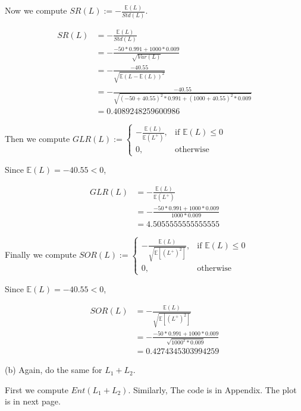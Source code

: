 \documentclass[letterpaper,11pt]{article}
\begin{document}
\begin{spacing}{1.2}
Now we compute $SR(L):= -\frac{\mathbb{E}(L)}{Std(L)}$.

\begin{equation}
\begin{aligned}
SR(L) &= -\frac{\mathbb{E}(L)}{Std(L)} \\
&= -\frac{-50*0.991+1000*0.009}{\sqrt{Var(L)}} \\
&= -\frac{-40.55}{\sqrt{\mathbb{E}(L - \mathbb{E}(L))^2}} \\
&= -\frac{-40.55}{\sqrt{(-50+40.55)^2 * 0.991 + (1000+40.55)^2 * 0.009}} \\
&= 0.4089248259600986
\end{aligned}
\end{equation}

Then we compute $GLR(L):= \begin{cases} -\frac{\mathbb{E}(L)}{\mathbb{E}(L^+)}, & \mbox{if } \mathbb{E}(L) \le 0 \\ 0, & \mbox{otherwise} \end{cases}$

Since $\mathbb{E}(L) = -40.55 < 0$,

\begin{equation}
\begin{aligned}
GLR(L) &= -\frac{\mathbb{E}(L)}{\mathbb{E}(L^+)} \\
&= -\frac{-50*0.991+1000*0.009}{1000*0.009} \\
&= 4.5055555555555555
\end{aligned}
\end{equation}

Finally we compute $SOR(L):= \begin{cases} -\frac{\mathbb{E}(L)}{\sqrt{\mathbb{E}[(L^+)^2]}}, & \mbox{if } \mathbb{E}(L) \le 0 \\ 0, & \mbox{otherwise} \end{cases}$

Since $\mathbb{E}(L) = -40.55 < 0$,

\begin{equation}
\begin{aligned}
SOR(L) &= -\frac{\mathbb{E}(L)}{\sqrt{\mathbb{E}[(L^+)^2]}} \\
&= -\frac{-50*0.991+1000*0.009}{\sqrt{1000^2*0.009}} \\
&= 0.4274345303994259
\end{aligned}
\end{equation}

(b) Again, do the same for $L_1+L_2$.

First we compute $Ent(L_1+L_2)$. Similarly, The code is in Appendix. The plot is in next page.


\end{spacing}
\end{document}
